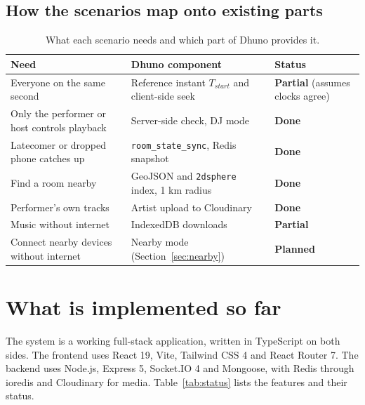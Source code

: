 \documentclass[11pt,a4paper]{article}
\newcommand{\done}{\textcolor{green!45!black}{\textbf{Done}}}
\newcommand{\partialstatus}{\textcolor{orange!80!black}{\textbf{Partial}}}
\newcommand{\planned}{\textcolor{red!60!black}{\textbf{Planned}}}
\begin{document}
\subsection{How the scenarios map onto existing parts}
\begin{table}[htbp]
\centering
\caption{What each scenario needs and which part of Dhuno provides it.}
\label{tab:mapping}
\footnotesize
\begin{tabularx}{\textwidth}{@{}>{\raggedright\arraybackslash}X>{\raggedright\arraybackslash}X l@{}}
\toprule
\textbf{Need} & \textbf{Dhuno component} & \textbf{Status} \\
\midrule
Everyone on the same second & Reference instant $T_{start}$ and client-side seek & \partialstatus{} (assumes clocks agree) \\
Only the performer or host controls playback & Server-side check, DJ mode & \done \\
Latecomer or dropped phone catches up & \texttt{room\_state\_sync}, Redis snapshot & \done \\
Find a room nearby & GeoJSON and \texttt{2dsphere} index, 1 km radius & \done \\
Performer's own tracks & Artist upload to Cloudinary & \done \\
Music without internet & IndexedDB downloads & \partialstatus{} \\
Connect nearby devices without internet & Nearby mode (Section~\ref{sec:nearby}) & \planned \\
\bottomrule
\end{tabularx}
\end{table}

\section{What is implemented so far}\label{sec:done}
The system is a working full-stack application, written in TypeScript on both sides. The
frontend uses React 19, Vite, Tailwind CSS 4 and React Router 7. The backend uses
Node.js, Express 5, Socket.IO 4 and Mongoose, with Redis through ioredis and Cloudinary
for media. Table~\ref{tab:status} lists the features and their status.
\end{document}
